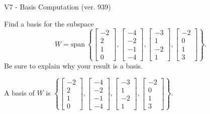 \begin{exercise}
  \begin{exerciseTitle}V7 - Basis Computation (ver. 939)\end{exerciseTitle}
  \begin{exerciseStatement}
    Find a basis for the subspace 
\[W=\mathrm{span}\ \left\{\left[\begin{array}{r}
-2 \\
2 \\
1 \\
0
\end{array}\right] , \left[\begin{array}{r}
-4 \\
-2 \\
-1 \\
-4
\end{array}\right] , \left[\begin{array}{r}
-3 \\
1 \\
-2 \\
1
\end{array}\right] , \left[\begin{array}{r}
-2 \\
0 \\
1 \\
3
\end{array}\right]\right\}.\]
 Be sure to explain why your result is a basis.


  \end{exerciseStatement}
  \begin{exerciseAnswer}
   A basis of \(W\) is  \(\left\{\left[\begin{array}{r}
-2 \\
2 \\
1 \\
0
\end{array}\right] , \left[\begin{array}{r}
-4 \\
-2 \\
-1 \\
-4
\end{array}\right] , \left[\begin{array}{r}
-3 \\
1 \\
-2 \\
1
\end{array}\right] , \left[\begin{array}{r}
-2 \\
0 \\
1 \\
3
\end{array}\right]\right\}\).
  


  \end{exerciseAnswer}
\end{exercise}